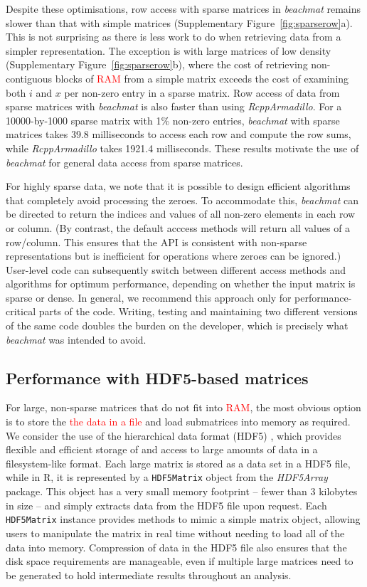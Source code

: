 \documentclass{article}
\newcommand{\beachmat}{\textit{beachmat}}
\newcommand{\code}[1]{\texttt{#1}}
\newcommand{\revised}[1]{\textcolor{red}{#1}}
\begin{document}
Despite these optimisations, row access with sparse matrices in \beachmat{} remains slower than that with simple matrices (Supplementary Figure~\ref{fig:sparserow}a).
This is not surprising as there is less work to do when retrieving data from a simpler representation.
The exception is with large matrices of low density (Supplementary Figure~\ref{fig:sparserow}b), where the cost of retrieving non-contiguous blocks of \revised{RAM} from a simple matrix exceeds the cost of examining both $i$ and $x$ per non-zero entry in a sparse matrix.
Row access of data from sparse matrices with \beachmat{} is also faster than using \textit{RcppArmadillo}.
For a 10000-by-1000 sparse matrix with 1\% non-zero entries, \beachmat{} with sparse matrices takes 39.8 milliseconds to access each row and compute the row sums, while \textit{RcppArmadillo} takes 1921.4 milliseconds.
These results motivate the use of \beachmat{} for general data access from sparse matrices.

For highly sparse data, we note that it is possible to design efficient algorithms that completely avoid processing the zeroes.
To accommodate this, \beachmat{} can be directed to return the indices and values of all non-zero elements in each row or column.
(By contrast, the default acccess methods will return all values of a row/column.
This ensures that the API is consistent with non-sparse representations but is inefficient for operations where zeroes can be ignored.)
User-level code can subsequently switch between different access methods and algorithms for optimum performance, depending on whether the input matrix is sparse or dense.
In general, we recommend this approach only for performance-critical parts of the code.
Writing, testing and maintaining two different versions of the same code doubles the burden on the developer, which is precisely what \beachmat{} was intended to avoid.

\subsection{Performance with HDF5-based matrices}
For large, non-sparse matrices that do not fit into \revised{RAM}, the most obvious option is to store the \revised{the data in a file} and load submatrices into memory as required.
We consider the use of the hierarchical data format (HDF5) \cite{hdf5}, which provides flexible and efficient storage of and access to large amounts of data in a filesystem-like format.
Each large matrix is stored as a data set in a HDF5 file, while in R, it is represented by a \code{HDF5Matrix} object from the \textit{HDF5Array} package.
This object has a very small memory footprint -- fewer than 3 kilobytes in size -- and simply extracts data from the HDF5 file upon request.
Each \code{HDF5Matrix} instance provides methods to mimic a simple matrix object, allowing users to manipulate the matrix in real time without needing to load all of the data into memory.
Compression of data in the HDF5 file also ensures that the disk space requirements are manageable, even if multiple large matrices need to be generated to hold intermediate results throughout an analysis.
\end{document}
